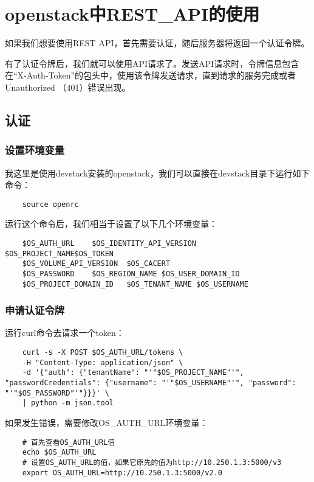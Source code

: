 \documentclass[a4paper,left=1.5cm,right=1.5cm,11pt]{article}
\begin{document}
\tableofcontents

\clearpage

\section{openstack中REST\_API的使用}
	如果我们想要使用REST API，首先需要认证，随后服务器将返回一个认证令牌。\par

	有了认证令牌后，我们就可以使用API请求了。发送API请求时，令牌信息包含在“X-Auth-Token”的包头中，使用该令牌发送请求，直到请求的服务完成或者Unauthorized （401）错误出现。

\subsection{认证}
\subsubsection{设置环境变量}
	我这里是使用devstack安装的openstack，我们可以直接在devstack目录下运行如下命令：
	\begin{lstlisting}
	source openrc
	\end{lstlisting}

	运行这个命令后，我们相当于设置了以下几个环境变量：
	\begin{lstlisting}
	$OS_AUTH_URL	$OS_IDENTITY_API_VERSION	$OS_PROJECT_NAME$OS_TOKEN	
	$OS_VOLUME_API_VERSION	$OS_CACERT	
	$OS_PASSWORD	$OS_REGION_NAME	$OS_USER_DOMAIN_ID        
	$OS_PROJECT_DOMAIN_ID	$OS_TENANT_NAME	$OS_USERNAME
	\end{lstlisting}

\subsubsection{申请认证令牌}
	运行curl命令去请求一个token：
	\begin{lstlisting}
	curl -s -X POST $OS_AUTH_URL/tokens \
	-H "Content-Type: application/json" \
	-d '{"auth": {"tenantName": "'"$OS_PROJECT_NAME"'", "passwordCredentials": {"username": "'"$OS_USERNAME"'", "password": "'"$OS_PASSWORD"'"}}}' \
	| python -m json.tool
	\end{lstlisting}

	如果发生错误，需要修改OS\_AUTH\_URL环境变量：
	\begin{lstlisting}
	# 首先查看OS_AUTH_URL值
	echo $OS_AUTH_URL
	# 设置OS_AUTH_URL的值，如果它原先的值为http://10.250.1.3:5000/v3
	export OS_AUTH_URL=http://10.250.1.3:5000/v2.0
	\end{lstlisting}
\end{document}
